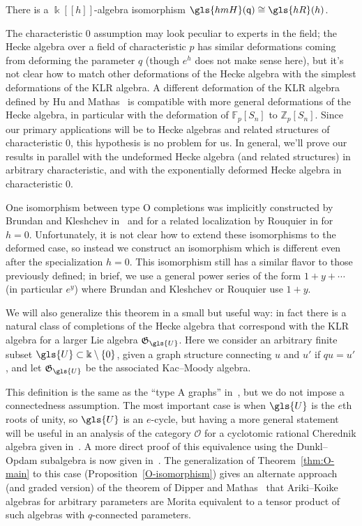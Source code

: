 \documentclass[ALCO,ThmDefs,Unicode,epreuves]{cedram}
\newcommand{\pq}{\mathsf{q}}
\newcommand{\K}{\Bbbk}%
\newcommand{\cO}{\mathcal{O}}
\newcommand{\hmH}{\gls{hmH}}
\newcommand{\hR}{\gls{hR}}
\newcommand\llbracket{[\![}
\newcommand\rrbracket{]\!]}
\begin{document}
\begin{theorem} \label{thm:O-main}
 There is a $\K\llbracket h\rrbracket $-algebra isomorphism $\hmH(\pq)\cong \hR(h)$. 
\end{theorem}
The characteristic 0 assumption may look peculiar to experts in the
field; the Hecke algebra over a field of characteristic $p$ has
similar deformations coming from deforming the parameter $q$ (though
$e^h$ does not make sense here), but it's not clear how to match other
deformations of the Hecke algebra with the simplest deformations of
the KLR algebra. 
A different deformation of the KLR algebra defined by Hu and Mathas~\cite{HMsemi} is
compatible with more general deformations of the Hecke algebra, in particular with the
deformation of $\mathbb{F}_p[S_n]$ to $\mathbb{Z}_p[S_n]$. 
Since our primary applications will be to Hecke algebras and
related structures of characteristic 0, this hypothesis is no problem
for us. In general, we'll prove our results in parallel with the undeformed Hecke
algebra (and related structures) in arbitrary characteristic, and with
the exponentially deformed Hecke algebra in characteristic 0.

One isomorphism between type O completions was implicitly constructed by Brundan and
Kleshchev in~\cite{BKKL} and for a related localization by Rouquier in
\cite[\S~3.2.5]{Rou2KM} for $h=0$. Unfortunately, it is not clear how
to extend these isomorphisms to the deformed case, so instead we
construct an isomorphism which is different even after the
specialization $h=0$. This isomorphism still has a similar flavor to those previously
defined; in brief, we use a general power series of the form
$1+y+\cdots$ (in particular $e^y$) where Brundan and Kleshchev or
Rouquier use $1+y$. 

We will also generalize this theorem in a small
but useful way: in fact there is a natural class of completions of the Hecke
algebra that correspond with the KLR algebra for a larger Lie
algebra $\mathfrak{G}_{\gls{U}}$. Here we consider an arbitrary finite subset $\gls{U}\subset \K\setminus\{0\}$, given a graph
structure connecting $u$ and $u'$ if $qu=u'$, and let $\mathfrak{G}_{\gls{U}}$
be the associated Kac--Moody algebra. 

This definition is the same as
the ``type A graphs'' in~\cite[\S~3.2.5]{Rou2KM}, but we do not impose
a connectedness assumption. 
The most important case is when $\gls{U}$ is the $e$th roots of unity, so
$\gls{U}$ is an $e$-cycle, but having a more general statement will be
useful in an analysis of the category $\cO$ for a cyclotomic rational
Cherednik algebra given in~\cite{WebRou}. A more direct proof of this
equivalence using the Dunkl--Opdam subalgebra is now given in~\cite{Webalt}. The generalization of
Theorem~\ref{thm:O-main} to this case (Proposition~\ref{O-isomorphism}) gives an
alternate approach (and graded version) of the theorem of Dipper and
Mathas~\cite{DMmorita} that Ariki--Koike algebras for arbitrary parameters are Morita
equivalent to a tensor product of such algebras with $q$-connected parameters.
\end{document}
